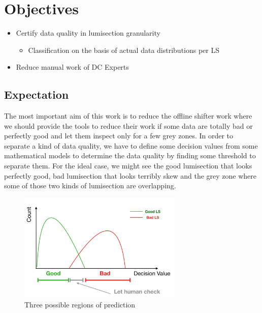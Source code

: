 \chapter{Objectives}

\begin{itemize}
    \item Certify data quality in lumisection granularity
    \begin{itemize}
        \item Classification on the basis of actual data distributions per LS
    \end{itemize}
    \item Reduce manual work of DC Experts
\end{itemize}

\section{Expectation}
The most important aim of this work is to reduce the offline shifter work where we should provide the tools to reduce their work if some data are totally bad or perfectly good and let them inspect only for a few grey zones.
In order to separate a kind of data quality, we have to define some decision values from some mathematical models to determine the data quality by finding some threshold to separate them.
For the ideal case, we might see the good lumisection that looks perfectly good, bad lumisection that looks terribly skew and the grey zone where some of those two kinds of lumisection are overlapping.

\begin{figure}[h!]
    \centering
    \includegraphics[width=0.7\textwidth]{images/expected_greyzone.png}
    \caption{Three possible regions of prediction}
    \label{fig:expected_greyzone}
\end{figure}

